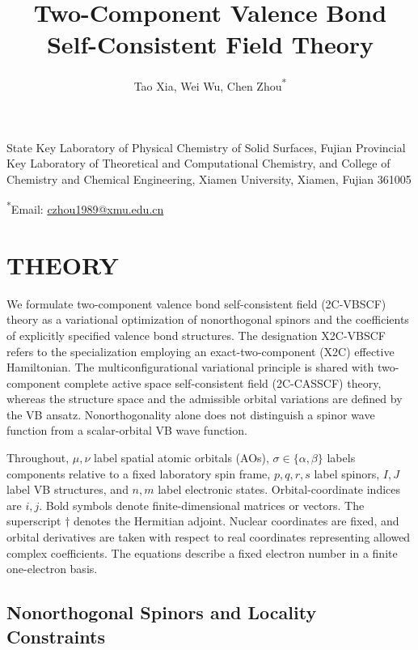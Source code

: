 \documentclass[12pt]{article}
\title{Two-Component Valence Bond Self-Consistent Field Theory}
\author{Tao Xia, Wei Wu, Chen Zhou\textsuperscript{*}}
\date{}
\begin{document}
\maketitle
\begin{center}
\small
State Key Laboratory of Physical Chemistry of Solid Surfaces, Fujian Provincial Key Laboratory of Theoretical and Computational Chemistry, and College of Chemistry and Chemical Engineering, Xiamen University, Xiamen, Fujian 361005

\medskip
\textsuperscript{*}Email: \href{mailto:czhou1989@xmu.edu.cn}{czhou1989@xmu.edu.cn}
\end{center}

\section{THEORY}

We formulate two-component valence bond self-consistent field (2C-VBSCF) theory as a variational optimization of nonorthogonal spinors and the coefficients of explicitly specified valence bond structures. The designation X2C-VBSCF refers to the specialization employing an exact-two-component (X2C) effective Hamiltonian. The multiconfigurational variational principle is shared with two-component complete active space self-consistent field (2C-CASSCF) theory,\cite{liao2024} whereas the structure space and the admissible orbital variations are defined by the VB ansatz. Nonorthogonality alone does not distinguish a spinor wave function from a scalar-orbital VB wave function.

Throughout, \(\mu,\nu\) label spatial atomic orbitals (AOs), \(\sigma\in\{\alpha,\beta\}\) labels components relative to a fixed laboratory spin frame, \(p,q,r,s\) label spinors, \(I,J\) label VB structures, and \(n,m\) label electronic states. Orbital-coordinate indices are \(i,j\). Bold symbols denote finite-dimensional matrices or vectors. The superscript \(\dagger\) denotes the Hermitian adjoint. Nuclear coordinates are fixed, and orbital derivatives are taken with respect to real coordinates representing allowed complex coefficients. The equations describe a fixed electron number in a finite one-electron basis.

\subsection{Nonorthogonal Spinors and Locality Constraints}
\end{document}
